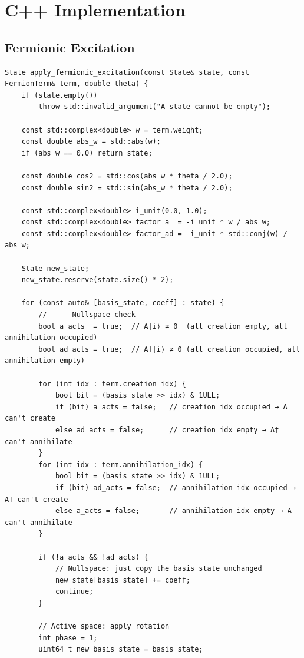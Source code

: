 \section{C++ Implementation}
\subsection{Fermionic Excitation}\label{subsec:appendix-fermionic-excitation}

\begin{verbatim}
State apply_fermionic_excitation(const State& state, const FermionTerm& term, double theta) {
    if (state.empty())
        throw std::invalid_argument("A state cannot be empty");

    const std::complex<double> w = term.weight;
    const double abs_w = std::abs(w);
    if (abs_w == 0.0) return state;

    const double cos2 = std::cos(abs_w * theta / 2.0);
    const double sin2 = std::sin(abs_w * theta / 2.0);

    const std::complex<double> i_unit(0.0, 1.0);
    const std::complex<double> factor_a  = -i_unit * w / abs_w;
    const std::complex<double> factor_ad = -i_unit * std::conj(w) / abs_w;

    State new_state;
    new_state.reserve(state.size() * 2);

    for (const auto& [basis_state, coeff] : state) {
        // ---- Nullspace check ----
        bool a_acts  = true;  // A|i⟩ ≠ 0  (all creation empty, all annihilation occupied)
        bool ad_acts = true;  // A†|i⟩ ≠ 0 (all creation occupied, all annihilation empty)

        for (int idx : term.creation_idx) {
            bool bit = (basis_state >> idx) & 1ULL;
            if (bit) a_acts = false;   // creation idx occupied → A can't create
            else ad_acts = false;      // creation idx empty → A† can't annihilate
        }
        for (int idx : term.annihilation_idx) {
            bool bit = (basis_state >> idx) & 1ULL;
            if (bit) ad_acts = false;  // annihilation idx occupied → A† can't create
            else a_acts = false;       // annihilation idx empty → A can't annihilate
        }

        if (!a_acts && !ad_acts) {
            // Nullspace: just copy the basis state unchanged
            new_state[basis_state] += coeff;
            continue;
        }

        // Active space: apply rotation
        int phase = 1;
        uint64_t new_basis_state = basis_state;


\end{verbatim}
